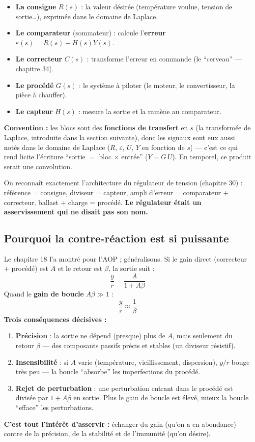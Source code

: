 \documentclass[12pt,a4paper,twoside]{book}
\begin{document}
\begin{formule}
\begin{itemize}[nosep]
\item \textbf{La consigne} $R(s)$ : la valeur désirée (température voulue, tension de sortie\ldots), exprimée dans le domaine de Laplace.
\item \textbf{Le comparateur} (sommateur) : calcule l'\textbf{erreur} $\varepsilon(s) = R(s) - H(s)Y(s)$.
\item \textbf{Le correcteur} $C(s)$ : transforme l'erreur en commande (le ``cerveau'' --- chapitre 34).
\item \textbf{Le procédé} $G(s)$ : le système à piloter (le moteur, le convertisseur, la pièce à chauffer).
\item \textbf{Le capteur} $H(s)$ : mesure la sortie et la ramène au comparateur.
\end{itemize}
\textbf{Convention :} les blocs sont des \textbf{fonctions de transfert} en $s$ (la transformée de Laplace, introduite dans la section suivante), donc les signaux sont eux aussi notés dans le domaine de Laplace ($R$, $\varepsilon$, $U$, $Y$ en fonction de $s$) --- c'est ce qui rend licite l'écriture ``sortie $=$ bloc $\times$ entrée'' ($Y = G\,U$). En temporel, ce produit serait une convolution.

On reconnaît exactement l'architecture du régulateur de tension (chapitre 30) : référence = consigne, diviseur = capteur, ampli d'erreur = comparateur + correcteur, ballast + charge = procédé. \textbf{Le régulateur était un asservissement qui ne disait pas son nom.}
\end{formule}

\subsection{Pourquoi la contre-réaction est si puissante}

\begin{formule}
Le chapitre 18 l'a montré pour l'AOP ; généralisons. Si le gain direct (correcteur + procédé) est $A$ et le retour est $\beta$, la sortie suit :
\[
\boxed{\frac{y}{r} = \frac{A}{1 + A\beta}}
\]
Quand le \textbf{gain de boucle} $A\beta \gg 1$ :
\[
\frac{y}{r} \approx \frac{1}{\beta}
\]
\textbf{Trois conséquences décisives :}
\begin{enumerate}[nosep]
\item \textbf{Précision} : la sortie ne dépend (presque) plus de $A$, mais seulement du retour $\beta$ --- des composants passifs précis et stables (un diviseur résistif).
\item \textbf{Insensibilité} : si $A$ varie (température, vieillissement, dispersion), $y/r$ bouge très peu --- la boucle ``absorbe'' les imperfections du procédé.
\item \textbf{Rejet de perturbation} : une perturbation entrant dans le procédé est divisée par $1 + A\beta$ en sortie. Plus le gain de boucle est élevé, mieux la boucle ``efface'' les perturbations.
\end{enumerate}
\textbf{C'est tout l'intérêt d'asservir :} échanger du gain (qu'on a en abondance) contre de la précision, de la stabilité et de l'immunité (qu'on désire).
\end{formule}
\end{document}
